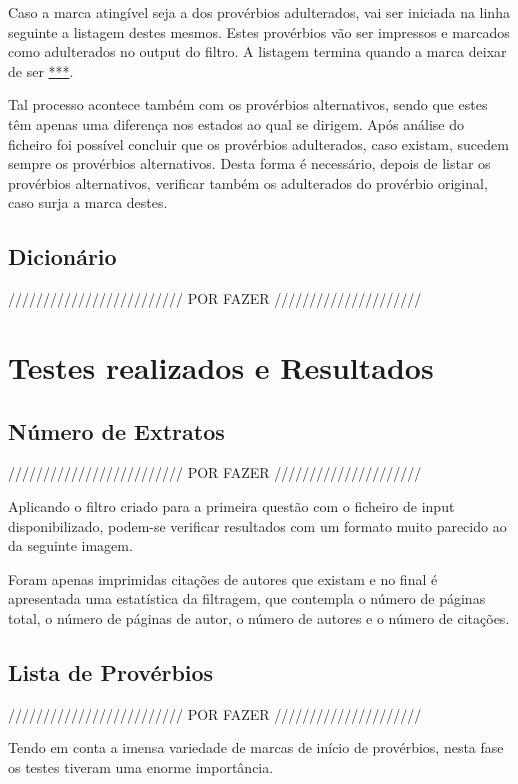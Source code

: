 \documentclass[11pt,a4paper]{report}
\begin{document}
Caso a marca atingível seja a dos provérbios adulterados, vai ser iniciada na linha seguinte a listagem destes mesmos. Estes provérbios vão ser impressos e marcados como adulterados no output do filtro. A listagem termina quando a marca deixar de ser \underline{***}.

Tal processo acontece também com os provérbios alternativos, sendo que estes têm apenas uma diferença nos estados ao qual se dirigem. Após análise do ficheiro foi possível concluir que os provérbios adulterados, caso existam, sucedem sempre os provérbios alternativos. Desta forma é necessário, depois de listar os provérbios alternativos, verificar também os adulterados do provérbio original, caso surja a marca destes.


\subsection{Dicionário}

///////////////////////// POR FAZER /////////////////////


\section{Testes realizados e Resultados}
\subsection{Número de Extratos}

///////////////////////// POR FAZER /////////////////////

Aplicando o filtro criado para a primeira questão com o ficheiro de input disponibilizado, podem-se verificar resultados com um formato muito parecido ao da seguinte imagem.

Foram apenas imprimidas citações de autores que existam e no final é apresentada uma estatística da filtragem, que contempla o número de páginas total, o número de páginas de autor, o número de autores e o número de citações.


\subsection{Lista de Provérbios}

///////////////////////// POR FAZER /////////////////////

Tendo em conta a imensa variedade de marcas de início de provérbios, nesta fase os testes tiveram uma enorme importância.
\end{document}
